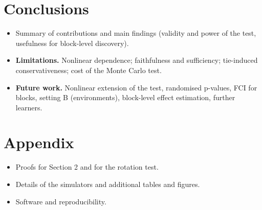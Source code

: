\documentclass[10pt,leqno]{amsart}
\begin{document}
\section{Conclusions}
\begin{itemize}
\item Summary of contributions and main findings (validity and power of the test,
  usefulness for block-level discovery).
\item \textbf{Limitations.} Nonlinear dependence; faithfulness and sufficiency;
  tie-induced conservativeness; cost of the Monte Carlo test.
\item \textbf{Future work.} Nonlinear extension of the test, randomised p-values,
  FCI for blocks, setting B (environments), block-level effect estimation, further
  learners.
\end{itemize}

\appendix
\section*{Appendix}
\begin{itemize}
\item Proofs for Section 2 and for the rotation test.
\item Details of the simulators and additional tables and figures.
\item Software and reproducibility.
\end{itemize}
\end{document}
